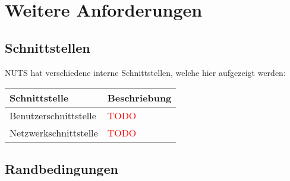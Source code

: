 \documentclass[
	ngerman,
	toc=listof, %
	toc=bibliography, %
	footnotes=multiple, %
	parskip=half, %
	numbers=noendperiod %
]{scrartcl}
\begin{document}
\section{Weitere Anforderungen}
	\subsection{Schnittstellen}
		NUTS hat verschiedene interne Schnittstellen, welche hier aufgezeigt werden: \\
		\begin{tabularx}{\textwidth}{lX}
			\toprule
			Schnittstelle & Beschriebung \\
			\midrule
			Benutzerschnittstelle & \textcolor{red}{TODO} \\
			Netzwerkschnittstelle & \textcolor{red}{TODO} \\
			\bottomrule
		\end{tabularx}

	\subsection {Randbedingungen}
\end{document}
